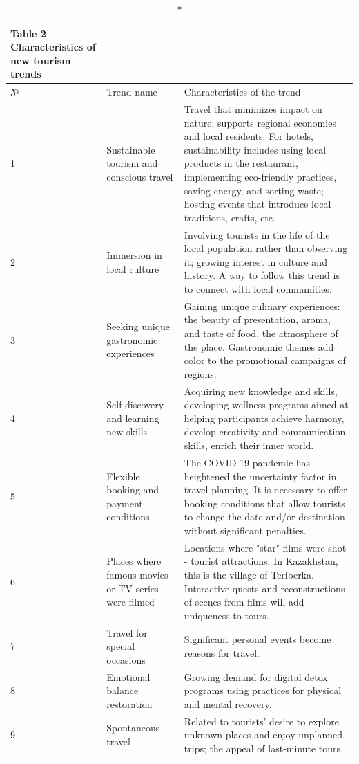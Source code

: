 \begin{longtable}[c]{|l|p{}|p{}|}
\caption*{Table 2 -- Characteristics of new tourism trends} \\
\hline
№ &
  Trend name &
  Characteristics of the trend \\ \hline
\endfirsthead
%
\endhead
%
1 &
  Sustainable tourism and conscious travel &
  Travel that minimizes impact on nature; supports regional economies and local residents. For hotels, sustainability includes using local products in the restaurant, implementing eco-friendly practices, saving energy, and sorting waste; hosting events that introduce local traditions, crafts, etc. \\ \hline
2 &
  Immersion in local culture &
  Involving tourists in the life of the local population rather than observing it; growing interest in culture and history. A way to follow this trend is to connect with local communities. \\ \hline
3 &
  Seeking unique gastronomic experiences &
  Gaining unique culinary experiences: the beauty of presentation, aroma, and taste of food, the atmosphere of the place. Gastronomic themes add color to the promotional campaigns of regions. \\ \hline
4 &
  Self-discovery and learning new skills &
  Acquiring new knowledge and skills, developing wellness programs aimed at helping participants achieve harmony, develop creativity and communication skills, enrich their inner world. \\ \hline
5 &
  Flexible booking and payment conditions &
  The COVID-19 pandemic has heightened the uncertainty factor in travel planning. It is necessary to offer booking conditions that allow tourists to change the date and/or destination without significant penalties. \\ \hline
6 &
  Places where famous movies or TV series were filmed &
  Locations where "star" films were shot - tourist attractions. In Kazakhstan, this is the village of Teriberka. Interactive quests and reconstructions of scenes from films will add uniqueness to tours. \\ \hline
7 &
  Travel for special occasions &
  Significant personal events become reasons for travel. \\ \hline
8 &
  Emotional balance restoration &
  Growing demand for digital detox programs using practices for physical and mental recovery. \\ \hline
9 &
  Spontaneous travel &
  Related to tourists' desire to explore unknown places and enjoy unplanned trips; the appeal of last-minute tours. \\ \hline

\end{longtable}
